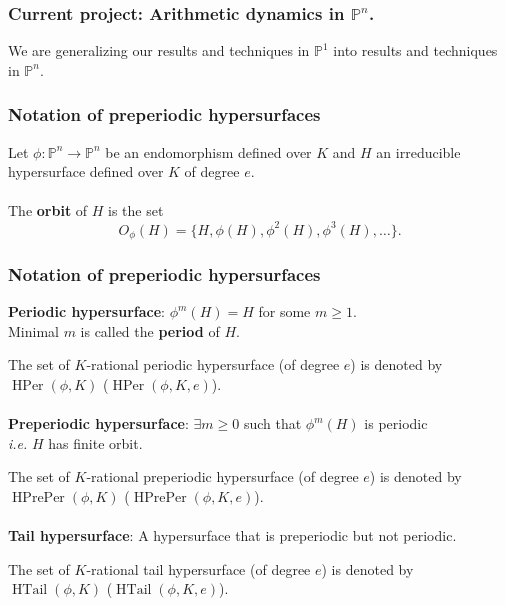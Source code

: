 \documentclass{beamer}
\def\PP{{\mathbb P}}
\DeclareMathOperator{\HTail}{HTail}
\DeclareMathOperator{\HPer}{HPer}
\DeclareMathOperator{\HPrePer}{HPrePer}
\theoremstyle{thmstyle}
\theoremstyle{thmstyle}
\theoremstyle{mystyle}
\theoremstyle{qstnstyle}
\begin{document}
\begin{frame}
\frametitle{Current project: Arithmetic dynamics in $\PP^n$.}


We are generalizing our results and techniques in $\PP^1$ into results and techniques in $\PP^n$.

\end{frame}

\begin{frame}
\frametitle{Notation of preperiodic hypersurfaces}
\pause
Let $\phi:\mathbb{P}^n\to\mathbb{P}^n$ be an endomorphism defined over $K$ and $H$ an irreducible hypersurface defined over $K$ of degree $e$.
\\\quad\\
\pause
The \textbf{orbit} of $H$ is the set 
$$ O_{\phi}(H) = \{H, \phi(H),\phi^2(H),\phi^3(H),\ldots \}.$$

\end{frame}


\begin{frame}
\frametitle{Notation of preperiodic hypersurfaces}

\textbf{Periodic hypersurface}: $\phi^m(H)=H$ for some $m\geq{1}$.
\\\quad\quad  Minimal $m$ is called the \textbf{period} of $H$.


\vspace{2mm}
The set of $K$-rational periodic hypersurface (of degree $e$) is denoted by $\HPer(\phi,K)$ ($\HPer(\phi,K,e)$).
\\\quad\\

\textbf{Preperiodic hypersurface}: $\exists m\geq{0}$ such that $\phi^m(H)$
is periodic \\\quad\quad  \emph{i.e.}  $H$ has finite orbit.


\vspace{2mm}
The set of $K$-rational preperiodic hypersurface (of degree $e$) is denoted by $\HPrePer(\phi,K)$ ($\HPrePer(\phi,K,e)$).
\\\quad\\

\textbf{Tail hypersurface}: A hypersurface that is preperiodic but not periodic.


\vspace{2mm}
The set of $K$-rational tail hypersurface (of degree $e$) is denoted by $\HTail(\phi,K)$ ($\HTail(\phi,K,e)$).
\end{frame}
\end{document}
